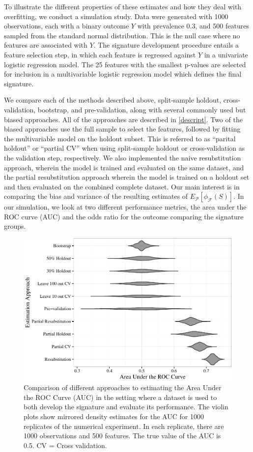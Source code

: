 \documentclass[12pt,]{article}
\begin{document}
To illustrate the different properties of these estimates and how they
deal with overfitting, we conduct a simulation study. Data were
generated with 1000 observations, each with a binary outcome \(Y\) with
prevalence 0.3, and 500 features sampled from the standard normal
distribution. This is the null case where no features are associated
with \(Y\). The signature development procedure entails a feature
selection step, in which each feature is regressed against \(Y\) in a
univariate logistic regression model. The 25 features with the smallest
p-values are selected for inclusion in a multivariable logistic
regression model which defines the final signature.

We compare each of the methods described above, split-sample holdout,
cross-validation, bootstrap, and pre-validation, along with several
commonly used but biased approaches. All of the approaches are described
in \ref{descript}. Two of the biased approaches use the full sample to
select the features, followed by fitting the multivariable model on the
holdout subset. This is referred to as ``parital holdout'' or ``partial
CV'' when using split-sample holdout or cross-validation as the
validation step, respectively. We also implemented the naive
resubstitution approach, wherein the model is trained and evaluated on
the same dataset, and the partial resubstitution approach wherein the
model is trained on a holdout set and then evaluated on the combined
complete dataset. Our main interest is in comparing the bias and
variance of the resulting estimates of
\(E_{\mathcal{P}}[\phi_{\mathcal{F}}(S)]\). In our simulation, we look
at two different performance metrics, the area under the ROC curve (AUC)
and the odds ratio for the outcome comparing the signature groups.

\begin{figure}[htbp]
\centering
\includegraphics{paper_files/figure-latex/cvsims-1.pdf}
\caption{Comparison of different approaches to estimating the Area Under
the ROC Curve (AUC) in the setting where a dataset is used to both
develop the signature and evaluate its performance. The violin plots
show mirrored density estimates for the AUC for 1000 replicates of the
numerical experiment. In each replicate, there are 1000 observations and
500 features. The true value of the AUC is 0.5. CV = Cross validation.
\label{fig1}}
\end{figure}
\end{document}
